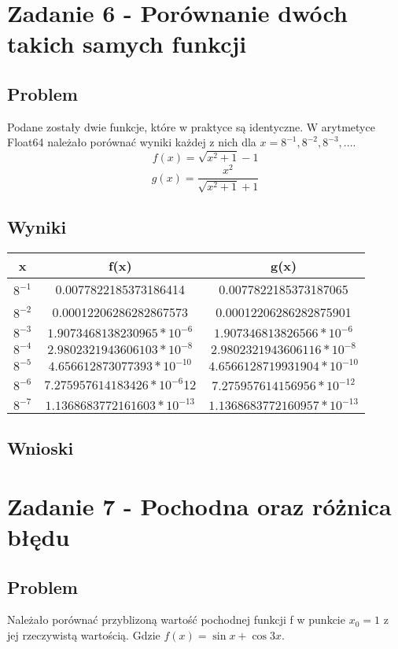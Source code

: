 \documentclass[12pt, a4paper]{article}
\begin{document}
\section{Zadanie 6 - Porównanie dwóch takich samych funkcji}
\subsection{Problem}
Podane zostały dwie funkcje, które w praktyce są identyczne. W arytmetyce Float64 należało porównać wyniki każdej z nich dla $x = 8^{-1}, 8^{-2}, 8^{-3},...$.
\[ f(x) = \sqrt{x^2 + 1} - 1 \]
\[ g(x) = \frac{x^2}{\sqrt{x^2 + 1} + 1} \]
\subsection{Wyniki}
\begin{center}
  \begin{tabular}{c|c|c}
    x & f(x) & g(x)\\
    \hline
    $8^{-1}$ & 0.0077822185373186414 & 0.0077822185373187065 \\
    $8^{-2}$ & 0.00012206286282867573 & 0.00012206286282875901 \\
    $8^{-3}$ & $1.9073468138230965 * 10^{-6}$ & $1.907346813826566 * 10^{-6}$ \\
    $8^{-4}$ & $2.9802321943606103 * 10^{-8}$ & $2.9802321943606116 * 10^{-8}$ \\
    $8^{-5}$ & $4.656612873077393 * 10^{-10}$ & $4.6566128719931904 * 10^{-10}$ \\
    $8^{-6}$ & $7.275957614183426 * 10^{-6}$12 & $7.275957614156956 * 10^{-12}$ \\
    $8^{-7}$ & $1.1368683772161603 * 10^{-13}$ & $1.1368683772160957 * 10^{-13}$
  \end{tabular}
\end{center}
\subsection{Wnioski}



\section{Zadanie 7 - Pochodna oraz różnica błędu}
\subsection{Problem}
Należało porównać przyblizoną wartość pochodnej funkcji f  w punkcie $x_{0} = 1$ z jej rzeczywistą wartością. Gdzie $f(x) = \sin{x} + \cos{3x}$.
\end{document}
